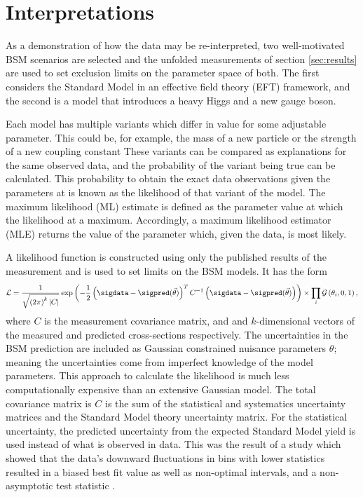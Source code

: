 \section{Interpretations}
\label{sec:interpretations}
As a demonstration of how the data may be re-interpreted, two well-motivated BSM scenarios are selected and the unfolded measurements of section \ref{sec:results} are used to set exclusion limits on the parameter space of both. The first considers the Standard Model in an effective field theory (EFT) framework, and the second is a model that introduces a heavy Higgs and a new gauge boson. 

Each model has multiple variants which differ in value for some adjustable parameter. This could be, for example, the mass of a new particle or the strength of a new coupling constant These variants can be compared as explanations for the same observed data, and the probability of the variant being true can be calculated. This probability to obtain the exact data observations given the parameters at is known as the likelihood of that variant of the model. The maximum likelihood (ML) estimate is defined as the parameter value at which the likelihood at a maximum. Accordingly, a maximum likelihood estimator (MLE) returns the value of the parameter which, given the data, is most likely. 

A likelihood function is constructed using only the published results of the measurement and is used to set limits on the BSM models. It has the form
\begin{equation}\label{eq:likelihood}
    \mathcal{L} = \frac{1}{\sqrt{ \left(2\pi\right)^k | C |}} \exp \left( - \frac{1}{2} \left( \sigdata - \sigpred(\vec{\theta}) \right)^T C^{-1} \left(  \sigdata - \sigpred(\vec{\theta})  \right) \right) \times \prod_{i} \mathcal{G}\left(\theta_{i}, 0, 1\right),
\end{equation}
where $C$ is the measurement covariance matrix, and \sigdata and \sigpred $k$-dimensional vectors of the measured and predicted cross-sections respectively. The uncertainties in the BSM prediction are included as Gaussian constrained nuisance parameters $\theta$; meaning the uncertainties come from imperfect knowledge of the model parameters. This approach to calculate the likelihood is much less computationally expensive than an extensive Gaussian model. The total covariance matrix is $C$ is the sum of the statistical and systematics uncertainty matrices and the Standard Model theory uncertainty matrix. For the statistical uncertainty, the predicted uncertainty from the expected Standard Model yield is used instead of what is observed in data. This was the result of a study which showed that the data's downward fluctuations in bins with lower statistics resulted in a biased best fit value as well as non-optimal intervals, and a non-asymptotic test statistic \cite{m4l_internal_note}. 

